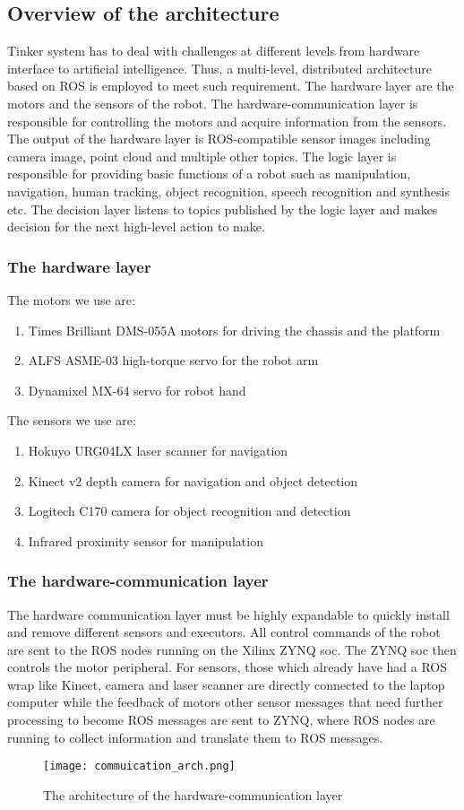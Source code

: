 \subsection{Overview of the architecture}
Tinker system has to deal with challenges at different levels from hardware interface to artificial intelligence. Thus, a multi-level, distributed architecture based on ROS is employed to meet such requirement. The hardware layer are the motors and the sensors of the robot. The hardware-communication layer is responsible for controlling the motors and acquire information from the sensors. The output of the hardware layer is ROS-compatible sensor images including camera image, point cloud and multiple other topics. The logic layer is responsible for providing basic functions of a robot such as manipulation, navigation, human tracking, object recognition, speech recognition and synthesis etc. The decision layer listens to topics published by the logic layer and makes decision for the next high-level action to make.
\subsubsection{The hardware layer}

The motors we use are:
\begin{enumerate}
    \item Times Brilliant DMS-055A motors for driving the chassis and the platform
    \item ALFS ASME-03 high-torque servo for the robot arm
    \item Dynamixel MX-64 servo for robot hand
\end{enumerate}
The sensors we use are:
\begin{enumerate}
    \item Hokuyo URG04LX laser scanner for navigation
    \item Kinect v2 depth camera for navigation and object detection
    \item Logitech C170 camera for object recognition and detection
    \item Infrared proximity sensor for manipulation
\end{enumerate}
\subsubsection{The hardware-communication layer}
The hardware communication layer must be highly expandable to quickly install and remove different sensors and executors. All control commands of the robot are sent to the ROS nodes running on the Xilinx ZYNQ soc. The ZYNQ soc then controls the motor peripheral. 
For sensors, those which already have had a ROS wrap like Kinect, camera and laser scanner are directly connected to the laptop computer while the feedback of motors other sensor messages that need further processing to become ROS messages are sent to ZYNQ, where ROS nodes are running to collect information and translate them to ROS messages.
\begin{figure}[!t]
	\centering
    \texttt{[image: commuication\_arch.png]}
    \caption{The architecture of the hardware-communication layer}
    \label{arch_comm}
\end{figure}

